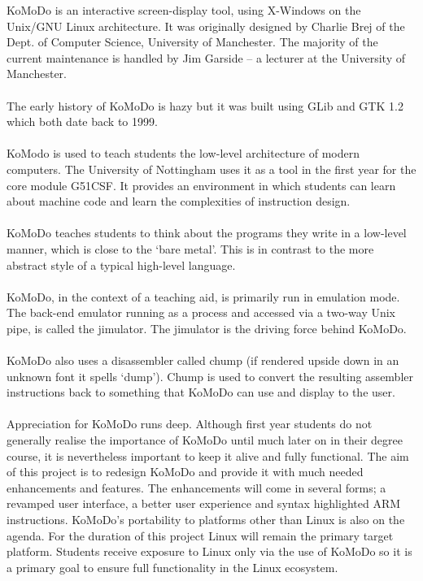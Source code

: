 KoMoDo is an interactive screen-display tool, using X-Windows on the Unix/GNU Linux architecture. It was originally designed by Charlie Brej of the Dept. of Computer Science, University of Manchester. The majority of the current maintenance is handled by Jim Garside -- a lecturer at the University of Manchester.\\\\
%
The early history of KoMoDo is hazy but it was built using GLib and GTK 1.2 which both date back to 1999.\\\\
%
KoModo is used to teach students the low-level architecture of modern computers. The University of Nottingham uses it as a tool in the first year for the core module G51CSF. It provides an environment in which students can learn about machine code and learn the complexities of instruction design.\\\\
%
KoMoDo teaches students to think about the programs they write in a low-level manner, which is close to the `bare metal'. This is in contrast to the more abstract style of a typical high-level language.\\\\
%
KoMoDo, in the context of a teaching aid, is primarily run in emulation mode. The back-end emulator running as a process and accessed via a two-way Unix pipe, is called the jimulator. The jimulator is the driving force behind KoMoDo.\\\\
%
KoMoDo also uses a disassembler called chump (if rendered upside down in an unknown font it spells `dump'). Chump is used to convert the resulting assembler instructions back to something that KoMoDo can use and display to the user.\\\\
%
Appreciation for KoMoDo runs deep. Although first year students do not generally realise the importance of KoMoDo until much later on in their degree course, it is nevertheless  important to keep it alive and fully functional.
%
The aim of this project is to redesign KoMoDo and provide it with much needed enhancements and features. The enhancements will come in several forms; a revamped user interface, a better user experience and syntax highlighted ARM instructions. KoMoDo's portability to platforms other than Linux is also on the agenda. For the duration of this project Linux will remain the primary target platform. Students receive exposure to Linux only via the use of KoMoDo so it is a primary goal to ensure full functionality in the Linux ecosystem.
